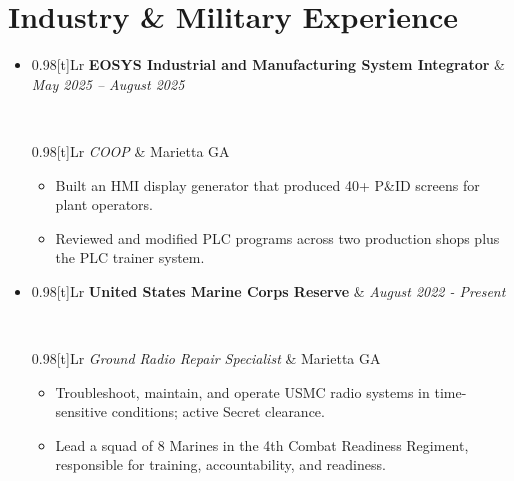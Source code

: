 \documentclass[a4paper,10pt]{article}
\newcommand{\resumeSubheading}[4]{%
  \vspace{0.5mm}\item
  \begin{tabularx}{0.98\textwidth}[t]{Lr}
    \textbf{#1} & \textit{\footnotesize{#4}} \\
  \end{tabularx}\\[-.8mm]
  \begin{tabularx}{0.98\textwidth}[t]{Lr}
    \textit{\footnotesize{#3}} & \footnotesize{#2} \\
  \end{tabularx}
  \vspace{-1.4mm}
}
\newcommand{\resumeSubHeadingListStart}{\begin{itemize}[leftmargin=*,labelsep=0mm]}
\newcommand{\resumeItemListStart}{\vspace{-1.1mm}\begin{justify}\begin{itemize}[leftmargin=3ex, rightmargin=2ex, noitemsep,labelsep=1.2mm,itemsep=0mm]\small}
\newcommand{\resumeSubHeadingListEnd}{\end{itemize}\vspace{0.9mm}}
\newcommand{\resumeItemListEnd}{\end{itemize}\end{justify}\vspace{-1.8mm}}
\begin{document}
\section{\textbf{Industry \& Military Experience}}
\resumeSubHeadingListStart
  \resumeSubheading
    {EOSYS Industrial and Manufacturing System Integrator}{Marietta GA}
    {COOP}{May 2025 – August 2025}
    \resumeItemListStart
      \item {Built an HMI display generator that produced 40+ P\&ID screens for plant operators.}
      \item {Reviewed and modified PLC programs across two production shops plus the PLC trainer system.}
  \resumeItemListEnd
  \vspace{-0.9mm}

  \resumeSubheading
    {United States Marine Corps Reserve}{Marietta GA}
    {Ground Radio Repair Specialist}{August 2022 - Present}
    \resumeItemListStart
  \item {Troubleshoot, maintain, and operate USMC radio systems in time-sensitive conditions; active Secret clearance.}
  \item {Lead a squad of 8 Marines in the 4th Combat Readiness Regiment, responsible for training, accountability, and readiness.}
  \resumeItemListEnd

\resumeSubHeadingListEnd
\end{document}
